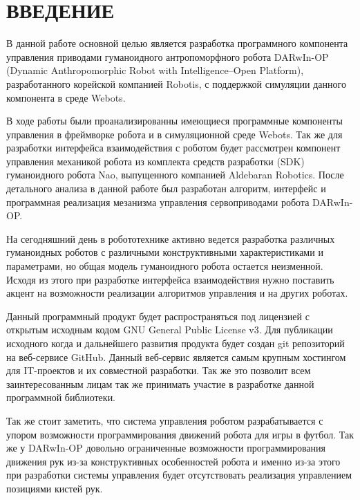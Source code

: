\chapter*{ВВЕДЕНИЕ}

В данной работе основной целью является разработка программного компонента управления приводами гуманоидного антропоморфного робота DARwIn-OP (Dynamic Anthropomorphic Robot with Intelligence–Open Platform), разработанного корейской компанией  Robotis, с поддержкой симуляции данного компонента в среде Webots.

В ходе работы были проанализированны имеющиеся программные компоненты управления в фреймворке робота и в симуляционной среде Webots. Так же для разработки интерфейса взаимодействия с роботом будет рассмотрен компонент управления механикой робота из комплекта средств разработки (SDK) гуманоидного робота Nao, выпущенного компанией Aldebaran Robotics. После детального анализа в данной работе был разработан алгоритм, интерфейс и программная реализация мезанизма управления сервоприводами робота DARwIn-OP.

На сегодняшний день в робототехнике активно ведется разработка различных гуманоидных роботов с различными конструктивными характеристиками и параметрами, но общая модель гуманоидного робота остается неизменной. Исходя из этого при разработке интерфейса взаимодействия нужно поставить акцент на возможности реализации алгоритмов управления и на других роботах.

Данный программный продукт будет распространяться под лицензией с открытым исходным кодом GNU General Public License v3. Для публикации исходного когда и дальнейшего развития продукта будет создан git репозиторий на веб-сервисе GitHub. Данный веб-сервис является самым крупным хостингом для IT-проектов и их совместной разработки. Так же это позволит всем заинтересованным лицам так же принимать участие в разработке данной программной библиотеки.

Так же стоит заметить, что система управления роботом разрабатывается с упором возможности программирования движений робота для игры в футбол. Так же у DARwIn-OP довольно ограниченные возможности программирования движения рук из-за конструктивных особенностей робота и именно из-за этого при разработки системы управления будет отсутствовать реализация управлением позициями кистей рук.